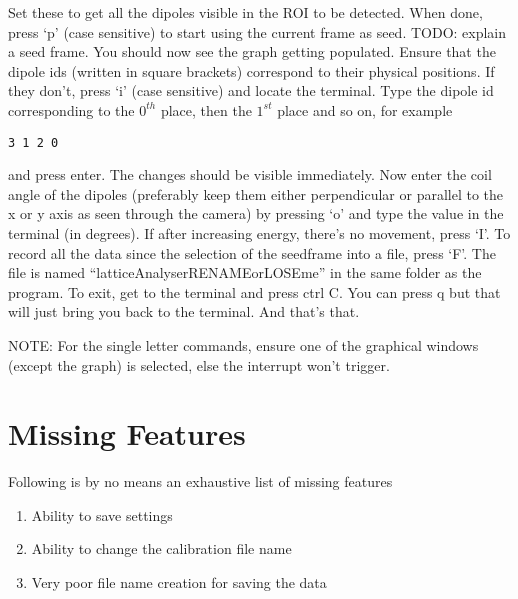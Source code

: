 		Set these to get all the dipoles visible in the ROI to be detected. When done, press `p' (case sensitive) to start using the current frame as seed. TODO: explain a seed frame. You should now see the graph getting populated. Ensure that the dipole ids (written in square brackets) correspond to their physical positions. If they don't, press `i' (case sensitive) and locate the terminal. Type the dipole id corresponding to the $0^{th}$ place, then the $1^{st}$ place and so on, for example
		\begin{lstlisting}
3 1 2 0
		\end{lstlisting}
		and press enter. The changes should be visible immediately. Now enter the coil angle of the dipoles (preferably keep them either perpendicular or parallel to the x or y axis as seen through the camera) by pressing `o' and type the value in the terminal (in degrees). If after increasing energy, there's no movement, press `I'. To record all the data since the selection of the seedframe into a file, press `F'. The file is named ``latticeAnalyserRENAMEorLOSEme'' in the same folder as the program. To exit, get to the terminal and press ctrl C. You can press q but that will just bring you back to the terminal. And that's that.
		\par
		NOTE: For the single letter commands, ensure one of the graphical windows (except the graph) is selected, else the interrupt won't trigger.
\section{Missing Features}
	Following is by no means an exhaustive list of missing features
	\begin{enumerate}
		\item Ability to save settings
		\item Ability to change the calibration file name
		\item Very poor file name creation for saving the data
	\end{enumerate}